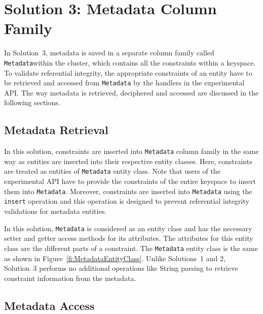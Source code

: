 \section{Solution 3:  Metadata Column Family}\label{s:Implementation-Solution3}

In Solution~3, metadata is saved in a separate column family called
\texttt{Metadata}within the cluster, which contains all the constraints within a
keyspace. To validate referential integrity, the appropriate constraints of an
entity have to be retrieved and accessed from \texttt{Metadata} by the handlers
in the experimental \ac{API}. The way metadata is retrieved, deciphered and accessed
are discussed in the following sections.
 
\subsection{Metadata Retrieval}
In this solution, constraints are inserted into \texttt{Metadata} column family
in the same way as entities are inserted into their respective entity
classes. 
Here, constraints are treated as entities of \texttt{Metadata} entity
class. Note that users of the experimental \ac{API} have to provide the
constraints of the entire keyspace to insert them into \texttt{Metadata}. Moreover, 
 constraints are inserted into \texttt{Metadata} using the \texttt{insert}
operation and this operation is designed to prevent referential
integrity validations for metadata entities.

In this solution, \texttt{Metadata} is considered as an entity class and has the
necessary setter and getter access methods for its attributes. The attributes
for this entity class are the different parts of a constraint. The
\texttt{Metadata} entity class is the same as shown in
Figure~\ref{fi:MetadataEntityClass}. Unlike Solutions~1 and 2, Solution~3
performs no additional operations like String parsing  to
retrieve constraint information from the metadata.

\subsection{Metadata Access}




